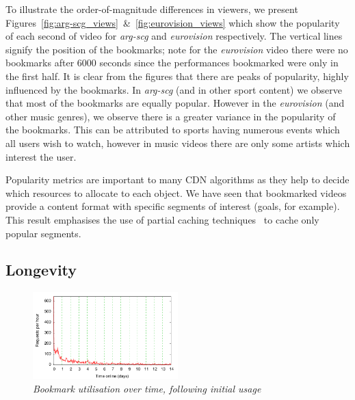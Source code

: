 \documentclass[a4paper,11pt]{article}
\newcommand{\capttext}{\protect\centering\em}
\begin{document}
To illustrate the order-of-magnitude differences in viewers, we present Figures~\ref{fig:arg-scg_views}~\&~\ref{fig:eurovision_views} which show the popularity of each second of video for \emph{arg-scg} and \emph{eurovision} respectively. The vertical lines signify the position of the bookmarks; note for the \emph{eurovision} video there were no bookmarks after 6000 seconds since the performances bookmarked were only in the first half. It is clear from the figures that there are peaks of popularity, highly influenced by the bookmarks. In \emph{arg-scg} (and in other sport content) we observe that most of the bookmarks are equally popular. However in the \emph{eurovision} (and other music genres), we observe there is a greater variance in the popularity of the bookmarks. This can be attributed to sports having numerous events which all users wish to watch, however in music videos there are only some artists which interest the user.

Popularity metrics are important to many CDN algorithms as they help to decide which resources to allocate to each object. We have seen that bookmarked videos provide a content format with specific segments of interest (goals, for example). This result emphasises the use of partial caching techniques~\cite{chen2003} to cache only popular segments.

\subsection{Longevity}
\label{sect:stay_popular}

\begin{figure}[tbp]
    \centering
    \includegraphics[width=0.5\textwidth]{./diagrams/all_bookpop_lifetime}
    \caption{\capttext Bookmark utilisation over time, following initial usage}
    \label{fig:lifetimes}
\end{figure}

\end{document}
